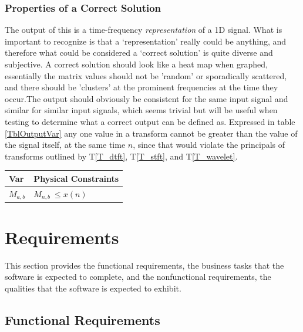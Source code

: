 \documentclass[12pt]{article}
\begin{document}
\subsubsection{Properties of a Correct Solution} \label{sec_CorrectSolution}

\noindent
The output of this \progname{} is a time-frequency \emph{representation} of a 1D signal. What is important to recognize is that a `representation' really could be anything, and therefore what could be considered a `correct solution' is quite diverse and subjective. A correct solution should look like a heat map when graphed, essentially the matrix values should not be 'random' or sporadically scattered, and there should be 'clusters' at the prominent frequencies at the time they occur.The output should obviously be consistent for the same input signal and similar for similar input signals, which seems trivial but will be useful when testing to determine what a correct output can be defined as. Expressed in table \ref{TblOutputVar} any one value in a transform cannot be greater than the value of the signal itself, at the same time $n$, since that would violate the principals of transforms outlined by T\ref{T_dtft}, T\ref{T_stft}, and T\ref{T_wavelet}.

\begin{table}[!h]
\caption{Output Variables} \label{TblOutputVar}
\renewcommand{\arraystretch}{1.2}
\noindent \begin{longtable*}{l l} 
  \toprule
  \textbf{Var} & \textbf{Physical Constraints} \\
  \midrule 
  $M_{a,b}$ & $ M_{n,b}\ \leq x(n) $
  \\
  \bottomrule
\end{longtable*}
\end{table}

\section{Requirements}

This section provides the functional requirements, the business tasks that the
software is expected to complete, and the nonfunctional requirements, the
qualities that the software is expected to exhibit.

\subsection{Functional Requirements}
\end{document}
